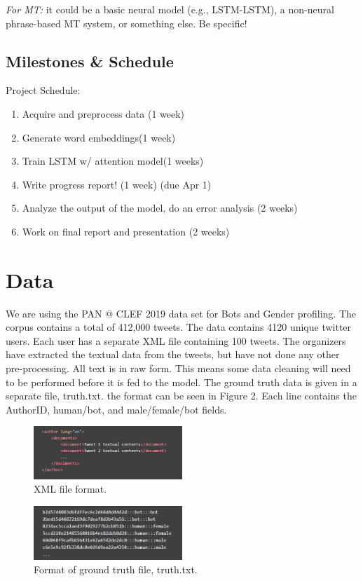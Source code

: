 \documentclass[11pt,a4paper]{article}
\begin{document}
\noindent\textit{For MT:} it could be a basic neural model (e.g., LSTM-LSTM), a non-neural phrase-based MT system, or something else. Be specific! 

\subsection{Milestones \& Schedule}
 Project Schedule:
\begin{enumerate}
    \item Acquire and preprocess data (1 week)
    \item Generate word embeddings(1 week)
    \item Train LSTM w/ attention model(1 weeks)
    \item Write progress report! (1 week) (due Apr 1)
    \item Analyze the output of the model, do an error analysis (2 weeks)
    \item Work on final report and presentation (2 weeks)
\end{enumerate}


\section{Data}
We are using the PAN @ CLEF 2019 data set for Bots and Gender profiling. The corpus contains a total of 412,000 tweets. The data contains 4120 unique twitter users. Each user has a separate XML file containing 100 tweets.
The organizers have extracted the textual data from the tweets, but have not done any other pre-processing. All text is in raw form. This means some data cleaning will need to be performed before it is fed to the model. 
The ground truth data is given in a separate file, truth.txt. the format can be seen in Figure 2. Each line contains the AuthorID, human/bot, and male/female/bot fields.



\begin{figure}[t]
    \centering
    \includegraphics[width=0.5\textwidth]{figs/xml.png}
    \caption{XML file format.}
    \label{fig:data_example}
\end{figure}

\begin{figure}[t]
    \centering
    \includegraphics[width=0.5\textwidth]{figs/truth.PNG}
    \caption{Format of ground truth file, truth.txt.}
    \label{fig:data_example}
\end{figure}
\end{document}
